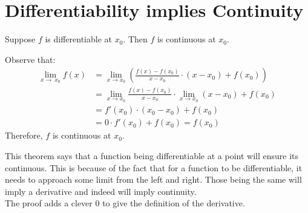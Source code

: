 \documentclass[12pt]{article}
\begin{document}
\section{Differentiability implies Continuity}
\begin{proposition}{}
    Suppose $f$ is differentiable at $x_0$. Then $f$ is continuous at $x_0$.  
\end{proposition}
\newpage
\begin{prf}{}
Observe that:\\
\begin{align*}
    \lim_{x\to\ x_0}{f(x)} &= \lim_{x\to x_0}{\left(\frac{f(x) - f(x_0)}{x - x_0}\cdot(x-x_0) + f(x_0)      \right)}\\ 
    &= \lim_{x\to x_0}{\frac{f(x) - f(x_0)}{x - x_0}} \cdot \lim_{x\to x_0}{(x - x_0)} + f(x_0)\\
    &= f'(x_0)\cdot (x_0 - x_0) + f(x_0)\\
    &= 0\cdot f'(x_0) + f(x_0) = f(x_0)
\end{align*}
Therefore, $f$ is continuous at $x_0$.
\end{prf}
\begin{explanation}{}
    This theorem says that a function being differentiable at a point will ensure its continuous. This is because of the fact that for a function to be differentiable, it needs to approach some limit from the left and right. Those being the same will imply a derivative and indeed will imply continuity.\\
    The proof adds a clever 0 to give the definition of the derivative.
\end{explanation}
\end{document}
